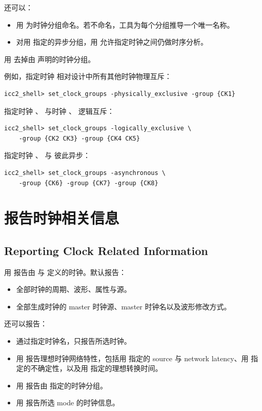 还可以：
\begin{itemize}
  \item 用  为时钟分组命名。若不命名，工具为每个分组推导一个唯一名称。
  \item 对用  指定的异步分组，用  允许指定时钟之间仍做时序分析。
\end{itemize}

用  去掉由  声明的时钟分组。

例如，指定时钟  相对设计中所有其他时钟物理互斥：
\begin{lstlisting}
icc2_shell> set_clock_groups -physically_exclusive -group {CK1}
\end{lstlisting}

指定时钟 、 与时钟 、 逻辑互斥：
\begin{lstlisting}
icc2_shell> set_clock_groups -logically_exclusive \
    -group {CK2 CK3} -group {CK4 CK5}
\end{lstlisting}

指定时钟 、 与  彼此异步：
\begin{lstlisting}
icc2_shell> set_clock_groups -asynchronous \
    -group {CK6} -group {CK7} -group {CK8}
\end{lstlisting}

\section{报告时钟相关信息}
\subsection*{Reporting Clock Related Information}

用  报告由  与  定义的时钟。默认报告：
\begin{itemize}
  \item 全部时钟的周期、波形、属性与源。
  \item 全部生成时钟的 master 时钟源、master 时钟名以及波形修改方式。
\end{itemize}

还可以报告：
\begin{itemize}
  \item 通过指定时钟名，只报告所选时钟。
  \item 用  报告理想时钟网络特性，包括用  指定的 source 与 network latency、用  指定的不确定性，以及用  指定的理想转换时间。
  \item 用 \opt{-groups} 报告由  指定的时钟分组。
  \item 用 \opt{-modes} 报告所选 mode 的时钟信息。
\end{itemize}

